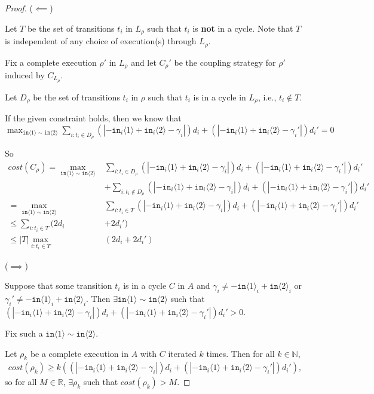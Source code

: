 \documentclass[12pt]{article}
\newcommand{\NN}{\mathbb{N}}
\newcommand{\RR}{\mathbb{R}}
\newcommand{\brangle}[1]{\langle #1 \rangle}
\theoremstyle{definition}
\begin{document}
\begin{proof}

    ($\impliedby$)

    Let $T$ be the set of transitions $t_i$ in $L_\rho$ such that $t_i$ is \textbf{not} in a cycle. Note that $T$ is independent of any choice of execution(s) through $L_\rho$. 

    Fix a complete execution $\rho'$ in $L_\rho$ and let $C_\rho'$ be the coupling strategy for $\rho'$ induced by $C_{L_\rho}$. 

    Let $D_\rho$ be the set of transitions $t_i$ in $\rho$ such that $t_i$ is in a cycle in $L_\rho$, i.e., $t_i\notin T$.  

    If the given constraint holds, then we know that $\max_{\texttt{in}\brangle{1}\sim\texttt{in}\brangle{2}}\sum_{i: t_i\in D_\rho}(|-\texttt{in}_i\brangle{1}+\texttt{in}_i\brangle{2}-\gamma_i|)d_i+(|-\texttt{in}_i\brangle{1}+\texttt{in}_i\brangle{2}-\gamma_i'|)d_i' = 0$

    So \begin{align*}
        cost(C_\rho) = \max_{\texttt{in}\brangle{1}\sim\texttt{in}\brangle{2}}&\sum_{i: t_i\in D_\rho}(|-\texttt{in}_i\brangle{1}+\texttt{in}_i\brangle{2}-\gamma_i|)d_i+(|-\texttt{in}_i\brangle{1}+\texttt{in}_i\brangle{2}-\gamma_i'|)d_i'\\
        &+\sum_{i: t_i\notin D_\rho}(|-\texttt{in}_i\brangle{1}+\texttt{in}_i\brangle{2}-\gamma_i|)d_i+(|-\texttt{in}_i\brangle{1}+\texttt{in}_i\brangle{2}-\gamma_i'|)d_i'\\
        = \max_{\texttt{in}\brangle{1}\sim\texttt{in}\brangle{2}}&\sum_{i: t_i\in T}(|-\texttt{in}_i\brangle{1}+\texttt{in}_i\brangle{2}-\gamma_i|)d_i+(|-\texttt{in}_i\brangle{1}+\texttt{in}_i\brangle{2}-\gamma_i'|)d_i'\\
        \leq \sum_{i:t_i\in T}(2d_i& + 2d_i')\\
        \leq |T|\max_{i:t_i\in T}&(2d_i + 2d_i')
    \end{align*}

    ($\implies$)

    Suppose that some transition $t_i$ is in a cycle $C$ in $A$ and $\gamma_i\neq -\texttt{in}\brangle{1}_i+\texttt{in}\brangle{2}_i$ or $\gamma_i'\neq  -\texttt{in}\brangle{1}_i+\texttt{in}\brangle{2}_i$. Then $\exists \texttt{in}\brangle{1}\sim \texttt{in}\brangle{2}$ such that $(|-\texttt{in}_i\brangle{1}+\texttt{in}_i\brangle{2}-\gamma_i|)d_i+(|-\texttt{in}_i\brangle{1}+\texttt{in}_i\brangle{2}-\gamma_i'|)d_i'>0$.

    Fix such a $\texttt{in}\brangle{1}\sim \texttt{in}\brangle{2}$. 

    Let $\rho_k$ be a complete execution in $A$ with $C$ iterated $k$ times. Then for all $k\in \NN$, \begin{align*}
        cost(\rho_k) \geq k((|-\texttt{in}_i\brangle{1}+\texttt{in}_i\brangle{2}-\gamma_i|)d_i+(|-\texttt{in}_i\brangle{1}+\texttt{in}_i\brangle{2}-\gamma_i'|)d_i'),
    \end{align*}
    so for all $M\in \RR$, $\exists \rho_k$ such that $cost(\rho_k) > M$.
\end{proof}
\end{document}
